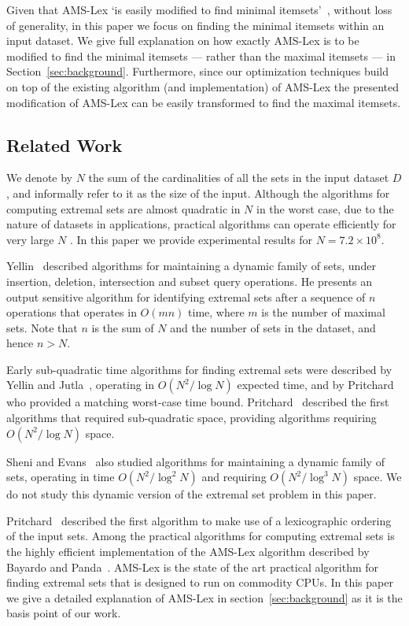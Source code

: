 \documentclass[13pt,a4paper]{article}
\begin{document}
Given that AMS-Lex `is easily modified to find minimal itemsets'~\cite{BayardoPanda11}, without loss of generality, in this paper we focus on finding the minimal itemsets within an input dataset. We give full explanation on how exactly AMS-Lex is to be modified to find the minimal itemsets --- rather than the maximal itemsets \cite{BayardoPanda11} --- in Section~\ref{sec:background}. Furthermore, since our optimization techniques build on top of the existing algorithm (and implementation) of AMS-Lex the presented modification of AMS-Lex can be easily transformed to find the maximal itemsets.


\subsection{Related Work}
\label{sec:intro:related_work}
\noindent

We denote by $N$ the sum of the cardinalities of all the sets in the input dataset $D$, and informally refer to it as the size of the input. Although the algorithms for computing extremal sets are almost quadratic in $N$ in the worst case, due to the nature of datasets in applications, practical algorithms can operate efficiently for very large $N$ \cite{BayardoPanda11}. In this paper we provide experimental results for $N = 7.2 \times 10^8$.

Yellin~\cite{Yellin92} described algorithms for maintaining a dynamic family of sets, under insertion, deletion, intersection and subset query operations. He presents an output sensitive algorithm for identifying extremal sets after a sequence of $n$ operations that operates in $O(mn)$ time, where $m$ is the number of maximal sets. Note that $n$ is the sum of $N$ and the number of sets in the dataset, and hence $n > N$.

Early sub-quadratic time algorithms for finding extremal sets were described by Yellin and Jutla~\cite{YellinJutla93}, operating in $O(N^2 / \log N)$ expected time, and by Pritchard~\cite{Pritchard97} who provided a matching worst-case time bound. Pritchard~\cite{Pritchard91} described the first algorithms that required sub-quadratic space, providing algorithms requiring $O(N^2 / \log N)$ space.

Sheni and Evans~\cite{Shen96} also studied algorithms for maintaining a dynamic family of sets, operating in time $O(N^2 / \log^2 N)$ and requiring $O(N^2 / \log^3 N)$ space.
We do not study this dynamic version of the extremal set problem in this paper. 

Pritchard~\cite{Pritchard97} described the first algorithm to make use of a lexicographic ordering of the input sets. Among the practical algorithms for computing extremal sets is the highly efficient implementation of the AMS-Lex algorithm described by Bayardo and Panda~\cite{BayardoPanda11}. AMS-Lex is the state of the art practical algorithm for finding extremal sets that is designed to run on commodity CPUs. In this paper we give a detailed explanation of AMS-Lex in section~\ref{sec:background} as it is the basis point of our work.
\end{document}
